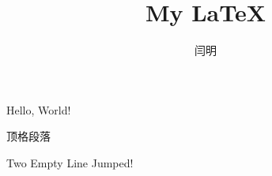 \documentclass{article}
\begin{document}
\title{My \LaTeX{}}
\author{闫明}
\maketitle
        Hello, World!
 
 
顶格段落
 
        Two Empty Line Jumped!
\end{document}
